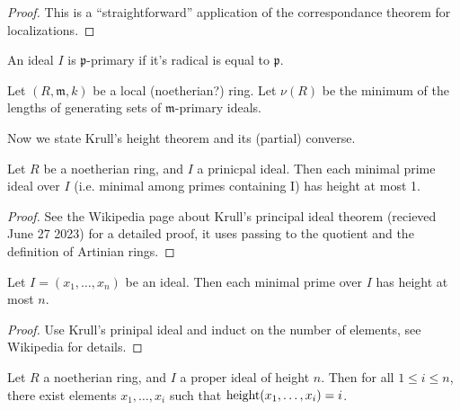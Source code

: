 \begin{proof}
    This is a ``straightforward'' application of the
    correspondance theorem for localizations.
\end{proof}
    
\begin{definition}
    \label{def:primary_ideal}
    An ideal \(I\) is \(\mathfrak{p}\)-primary if it's
    radical is equal to \(\mathfrak{p}\).
\end{definition}

\begin{definition}
    \label{def:min_len_gen_set_maximal}
    Let \((R,\mathfrak{m},k)\) be a local (noetherian?) ring.
    Let \(\nu(R)\)
    be the minimum of the lengths of generating sets of  
    \(\mathfrak{m}\)-primary ideals.
\end{definition}

Now we state Krull's height theorem and its (partial) converse.



\begin{theorem}
    \label{thm:krull_principal_ideal}
    Let \(R\) be a noetherian ring, 
    and \(I\) a prinicpal ideal.
    Then each minimal prime ideal over \(I\) 
    (i.e. minimal among primes containing I)
    has height at most 1.
\end{theorem}

\begin{proof}
    See the Wikipedia page about Krull's principal ideal theorem
    (recieved June 27 2023) for a detailed proof,
    it uses passing to the quotient and the definition of
    Artinian rings.
\end{proof}

\begin{theorem}
    \label{thm:krull_height}
    Let \(I = (x_{1}, \ldots, x_{n})\) be an ideal. 
    Then each minimal prime over \(I\) has height
    at most \(n\).
\end{theorem}

\begin{proof}
    Use Krull's prinipal ideal and induct on the 
    number of elements, see Wikipedia for details.
\end{proof}

\begin{theorem}
    \label{thm:genset_of_any_height_of_noetherian_height_n}
    Let \(R\) a noetherian ring, and \(I\) a proper 
    ideal of height \(n\).
    Then for all \(1 \leq i \leq n\),
    there exist elements \(x_{1}, \ldots, x_{i}\)
    such that
    \(\operatorname{height} (x_{1}, \ldots, x_{i}) = i\).
\end{theorem}

